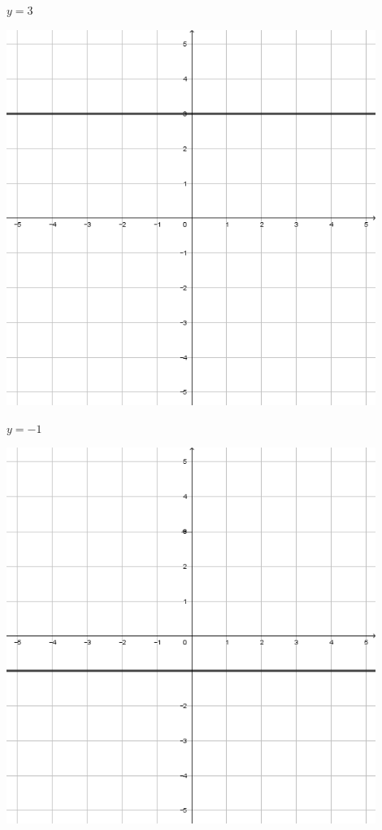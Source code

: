 \documentclass[a4paper]{oblivoir}
\begin{document}
\clearpage
\begin{minipage}{0.45\textwidth}\centering
\(y=3\)
\par\bigskip\includegraphics[width=0.9\textwidth]{img/1_line_29}
\end{minipage}
\begin{minipage}{0.45\textwidth}\centering
\(y=-1\)
\par\bigskip\includegraphics[width=0.9\textwidth]{img/1_line_30}
\end{minipage}\bigskip\bigskip\par
\end{document}
